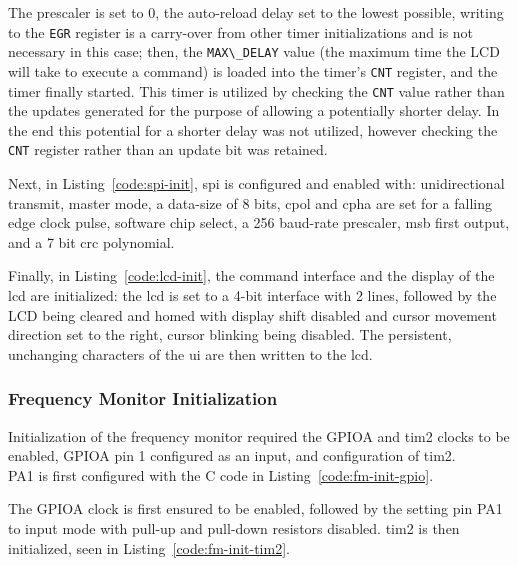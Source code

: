 The prescaler is set to 0, the auto-reload delay set to the lowest
possible, writing to the \lstinline{EGR} register is a carry-over from
other timer initializations and is not necessary in this case; then, the
\lstinline{MAX\_DELAY} value (the maximum time the LCD will take to
execute a command) is loaded into the timer's \lstinline{CNT}
register, and the timer finally started. This timer is utilized
by checking the \lstinline{CNT} value rather than the updates generated
for the purpose of allowing a potentially shorter delay. In the end this
potential for a shorter delay was not utilized, however checking the
\lstinline{CNT} register rather than an update bit was retained.

Next, in Listing~\ref{code:spi-init}, \gls{spi} is configured and
enabled with: unidirectional transmit, master mode, a data-size of 8
bits, \gls{cpol} and \gls{cpha} are set for a falling edge clock pulse, software chip select, a 256 baud-rate
prescaler, \gls{msb} first output, and a 7 bit \gls{crc} polynomial.


Finally, in Listing~\ref{code:lcd-init}, the command interface and
the display of the \gls{lcd} are initialized: the \gls{lcd} is set to a
4-bit interface with 2 lines, followed by the LCD being cleared and
homed with display shift disabled and cursor movement direction set to
the right, cursor blinking being disabled. The persistent, unchanging
characters of the \gls{ui} are then written to the \gls{lcd}.


\subsubsection{Frequency Monitor Initialization}

Initialization of the frequency monitor required the GPIOA and
\gls{tim2} clocks to be enabled, GPIOA pin 1 configured as an input,
and configuration of \gls{tim2}. \\

PA1 is first configured with the C code in Listing~\ref{code:fm-init-gpio}.


The GPIOA clock is first ensured to be enabled, followed by the setting
pin PA1 to input mode with pull-up and pull-down resistors disabled.
\gls{tim2} is then initialized, seen in Listing~\ref{code:fm-init-tim2}.

